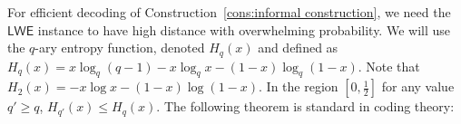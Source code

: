 \documentclass[11pt]{article}
\newcommand{\consref}[1]{\mbox{Construction~\ref{#1}}}
\newcommand{\class}[1]{{\ensuremath{\mathsf{#1}}}}
\newcommand{\zo}{\ensuremath{\{0, 1\}}}
\newcommand{\LWE}{\class{LWE}}
\newtheorem{definition}[theorem]{Definition}
\begin{document}
%
%
%
For efficient decoding of \consref{cons:informal construction}, we need the $\LWE$ instance to have high distance with overwhelming probability.  We will use the $q$-ary entropy function, denoted $H_q(x)$ and defined as $H_q(x) = x\log _q(q-1) - x\log_q x - (1-x)\log_q (1-x)$.  Note that $H_2(x) = -x\log x - (1-x)\log (1-x)$.  In the region $[0, \frac{1}{2}]$ for any value $q'\geq q$, $H_{q'}(x)\leq H_{q}(x)$.  The following theorem is standard in coding theory:
\end{document}
